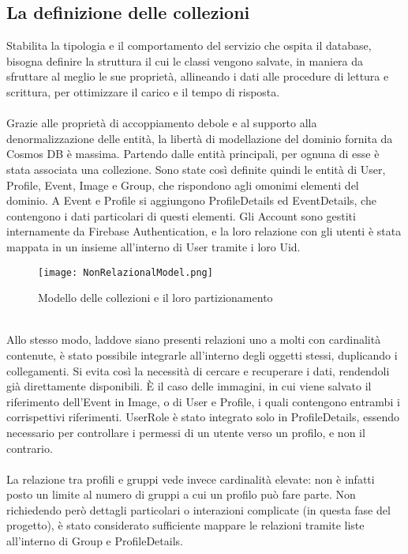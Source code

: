 \subsection{La definizione delle collezioni}

Stabilita la tipologia e il comportamento del servizio che ospita il database,
bisogna definire la struttura il cui le classi vengono salvate,
in maniera da sfruttare al meglio le sue proprietà,
allineando i dati alle procedure di lettura e scrittura,
per ottimizzare il carico e il tempo di risposta.\\
\\
Grazie alle proprietà di accoppiamento debole e al supporto alla denormalizzazione delle entità,
la libertà di modellazione del dominio fornita da Cosmos DB è massima.
Partendo dalle entità principali, per ognuna di esse è stata associata una collezione.
Sono state così definite quindi le entità di User, Profile, Event, Image e Group,
che rispondono agli omonimi elementi del dominio.
A Event e Profile si aggiungono ProfileDetails ed EventDetails,
che contengono i dati particolari di questi elementi.
Gli Account sono gestiti internamente da Firebase Authentication,
e la loro relazione con gli utenti è stata mappata in un insieme all'interno di User
tramite i loro Uid.\\
\begin{figure}[htbp]
    \centering
    \texttt{[image: NonRelazionalModel.png]}
    \caption{Modello delle collezioni e il loro partizionamento}
\end{figure}
\\
Allo stesso modo, laddove siano presenti relazioni uno a molti con cardinalità contenute,
è stato possibile integrarle all'interno degli oggetti stessi, duplicando i collegamenti.
Si evita così la necessità di cercare e recuperare i dati, 
rendendoli già direttamente disponibili.
È il caso delle immagini, in cui viene salvato il riferimento dell'Event in Image,
o di User e Profile, i quali contengono entrambi i corrispettivi riferimenti.
UserRole è stato integrato solo in ProfileDetails,
essendo necessario per controllare i permessi di un utente verso un profilo, e non il contrario.\\
\\
La relazione tra profili e gruppi vede invece cardinalità elevate:
non è infatti posto un limite al numero di gruppi a cui un profilo può fare parte.
Non richiedendo però dettagli particolari o interazioni complicate (in questa fase del progetto),
è stato considerato sufficiente mappare le relazioni tramite liste all'interno di Group e ProfileDetails.\\
